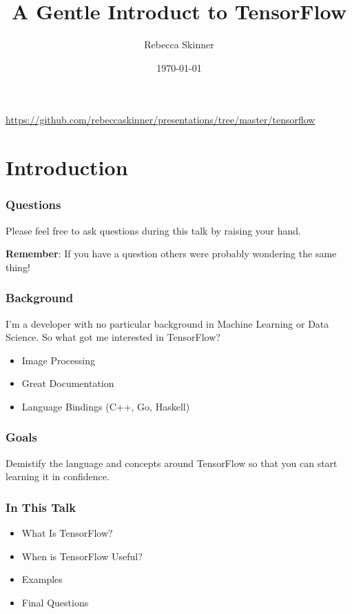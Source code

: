 \documentclass{beamer}
\title{A Gentle Introduct to TensorFlow}
\author{Rebecca Skinner}
\institute{Asteris}
\date{\today}
\begin{document}
\begin{frame}
  \titlepage{}
  \url{https://github.com/rebeccaskinner/presentations/tree/master/tensorflow}
\end{frame}

\section{Introduction}

\begin{frame}
  \frametitle{Questions}

  Please feel free to ask questions during this talk by raising your hand.

  {\bf Remember}: If you have a question others were probably wondering the same thing!
\end{frame}


\begin{frame}
  \frametitle{Background}
  I'm a developer with no particular background in Machine Learning or
  Data Science.  So what got me interested in TensorFlow?
  \begin{itemize}
    \item Image Processing
    \item Great Documentation
    \item Language Bindings (C++, Go, Haskell)
  \end{itemize}
\end{frame}

\begin{frame}
  \frametitle{Goals}
  Demistify the language and concepts around TensorFlow so that you
  can start learning it in confidence.
\end{frame}

\begin{frame}
  \frametitle{In This Talk}

  \begin{itemize}
  \item What Is TensorFlow?
  \item When is TensorFlow Useful?
  \item Examples
  \item Final Questions
  \end{itemize}
\end{frame}
\end{document}

